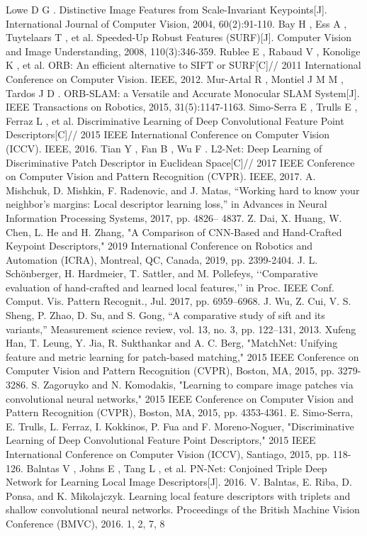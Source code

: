 \documentclass{svproc}
\begin{document}
\begin{thebibliography}{99}

 Lowe D G . Distinctive Image Features from Scale-Invariant Keypoints[J]. International Journal of Computer Vision, 2004, 60(2):91-110.
 Bay H , Ess A , Tuytelaars T , et al. Speeded-Up Robust Features (SURF)[J]. Computer Vision and Image Understanding, 2008, 110(3):346-359.
 Rublee E , Rabaud V , Konolige K , et al. ORB: An efficient alternative to SIFT or SURF[C]// 2011 International Conference on Computer Vision. IEEE, 2012.
 Mur-Artal R , Montiel J M M , Tardos J D . ORB-SLAM: a Versatile and Accurate Monocular SLAM System[J]. IEEE Transactions on Robotics, 2015, 31(5):1147-1163.
 Simo-Serra E , Trulls E , Ferraz L , et al. Discriminative Learning of Deep Convolutional Feature Point Descriptors[C]// 2015 IEEE International Conference on Computer Vision (ICCV). IEEE, 2016.
 Tian Y , Fan B , Wu F . L2-Net: Deep Learning of Discriminative Patch Descriptor in Euclidean Space[C]// 2017 IEEE Conference on Computer Vision and Pattern Recognition (CVPR). IEEE, 2017.
 A. Mishchuk, D. Mishkin, F. Radenovic, and J. Matas, “Working hard to know your neighbor’s margins: Local descriptor learning loss,” in Advances in Neural Information Processing Systems, 2017, pp. 4826– 4837.
 Z. Dai, X. Huang, W. Chen, L. He and H. Zhang, "A Comparison of CNN-Based and Hand-Crafted Keypoint Descriptors," 2019 International Conference on Robotics and Automation (ICRA), Montreal, QC, Canada, 2019, pp. 2399-2404.
 J. L. Schönberger, H. Hardmeier, T. Sattler, and M. Pollefeys, ‘‘Comparative evaluation of hand-crafted and learned local features,’’ in Proc. IEEE Conf. Comput. Vis. Pattern Recognit., Jul. 2017, pp. 6959–6968.
 J. Wu, Z. Cui, V. S. Sheng, P. Zhao, D. Su, and S. Gong, “A comparative study of sift and its variants,” Measurement science review, vol. 13, no. 3, pp. 122–131, 2013.
 Xufeng Han, T. Leung, Y. Jia, R. Sukthankar and A. C. Berg, "MatchNet: Unifying feature and metric learning for patch-based matching," 2015 IEEE Conference on Computer Vision and Pattern Recognition (CVPR), Boston, MA, 2015, pp. 3279-3286.
 S. Zagoruyko and N. Komodakis, "Learning to compare image patches via convolutional neural networks," 2015 IEEE Conference on Computer Vision and Pattern Recognition (CVPR), Boston, MA, 2015, pp. 4353-4361.
 E. Simo-Serra, E. Trulls, L. Ferraz, I. Kokkinos, P. Fua and F. Moreno-Noguer, "Discriminative Learning of Deep Convolutional Feature Point Descriptors," 2015 IEEE International Conference on Computer Vision (ICCV), Santiago, 2015, pp. 118-126.
 Balntas V , Johns E , Tang L , et al. PN-Net: Conjoined Triple Deep Network for Learning Local Image Descriptors[J]. 2016.
 V. Balntas, E. Riba, D. Ponsa, and K. Mikolajczyk. Learning local feature descriptors with triplets and shallow convolutional neural networks. Proceedings of the British Machine Vision Conference (BMVC), 2016. 1, 2, 7, 8
\end{thebibliography}
\end{document}
